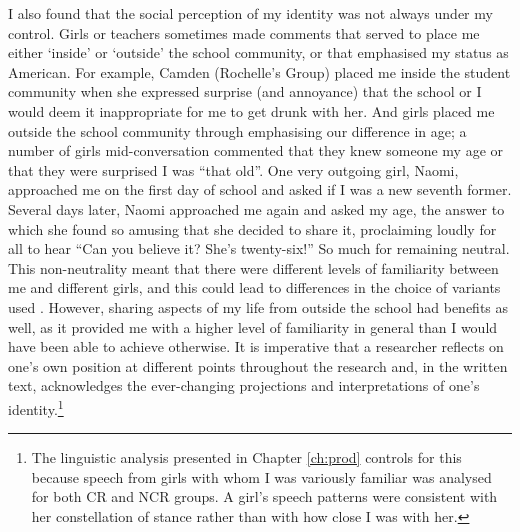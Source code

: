 I also found that the social perception of my identity was not always under my control.  Girls or teachers sometimes made comments that served to place me either `inside' or `outside' the school community, or that emphasised my status as American.  For example, Camden (Rochelle's Group) placed me inside the student community when she expressed surprise (and annoyance) that the school or I would deem it inappropriate for me to get drunk with her.  And girls placed me outside the school community through emphasising our difference in age; a number of girls mid-conversation commented that they knew someone my age or that they were surprised I was ``that old''.  One very outgoing girl, Naomi, approached me on the first day of school and asked if I was a new seventh former.  Several days later, Naomi approached me again and asked my age, the answer to which she found so amusing that she decided to share it, proclaiming loudly for all to hear ``Can you believe it?  She's twenty-six!''  So much for remaining neutral.  This non-neutrality meant that there were different levels of familiarity between me and different girls, and this could lead to differences in the choice of variants used \cite{cukoravilabailey}.  However, sharing aspects of my life from outside the school had benefits as well, as it provided me with a higher level of familiarity in general than I would have been able to achieve otherwise.  It is imperative that a researcher reflects on one's own position at different points throughout the research and, in the written text, acknowledges the ever-changing projections and interpretations of one's identity.\footnote{The linguistic analysis presented in Chapter \ref{ch:prod} controls for this because speech from girls with whom I was variously familiar was analysed for both CR and NCR groups.  A girl's speech patterns were consistent with her constellation of stance rather than with how close I was with her.}  





